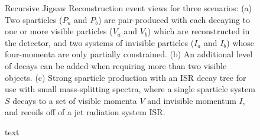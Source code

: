 \begin{figure}[tb]
\centering
{}
\caption{\label{fig:RJRTrees} 
Recursive Jigsaw Reconstruction event views for three scenarios: (a)
Two sparticles ($P_{a}$ and $P_{b}$) are pair-produced with each
decaying to one or more visible particles ($V_{a}$ and $V_{b}$) which
are reconstructed in the detector, and two systems of invisible
particles ($I_{a}$ and $I_{b}$) whose four-momenta are only partially
constrained. (b) An additional level of decays can be added when
requiring more than two visible objects. (c) Strong sparticle
production with an ISR decay tree for use with small mass-splitting
spectra, where a single sparticle system $S$ decays to a set of
visible momenta $V$ and invisible momentum $I$, and recoils off of a
jet radiation system ISR.  }
\end{figure}

\begin{figure}[tb]
\centering
{}
\caption{\label{fig:ICHEPLimits} text
}
\end{figure}

